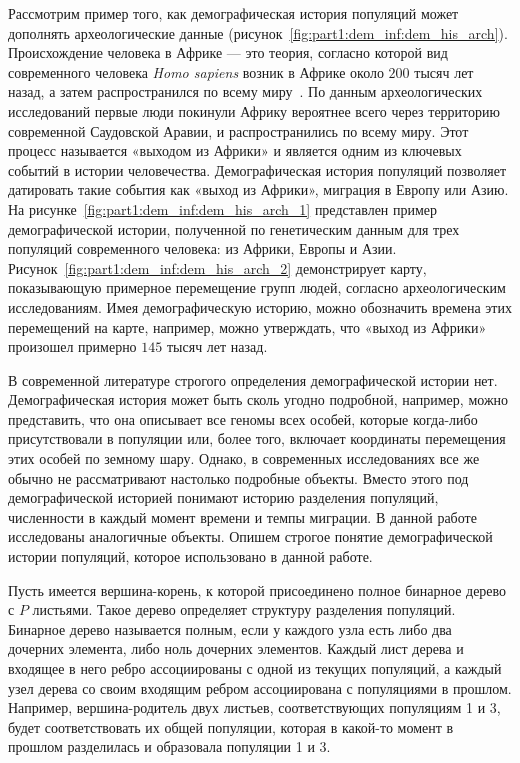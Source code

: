 Рассмотрим пример того, как демографическая история популяций может дополнять археологические данные (рисунок~\ref{fig:part1:dem_inf:dem_his_arch}).
Происхождение человека в Африке --- это теория, согласно которой вид современного человека \textit{Homo sapiens} возник в Африке около $200$ тысяч лет назад, а затем распространился по всему миру~\cite{nielsen2017tracing}.
По данным археологических исследований первые люди покинули Африку вероятнее всего через территорию современной Саудовской Аравии, и распространились по всему миру.
Этот процесс называется «выходом из Африки» и является одним из ключевых событий в истории человечества.
Демографическая история популяций позволяет датировать такие события как «выход из Африки», миграция в Европу или Азию.
На рисунке~\ref{fig:part1:dem_inf:dem_his_arch_1} представлен пример демографической истории, полученной по генетическим данным для трех популяций современного человека: из Африки, Европы и Азии.
Рисунок~\ref{fig:part1:dem_inf:dem_his_arch_2} демонстрирует карту, показывающую примерное перемещение групп людей, согласно археологическим исследованиям.
Имея демографическую историю, можно обозначить времена этих перемещений на карте, например, можно утверждать, что «выход из Африки» произошел примерно $145$ тысяч лет назад.


В современной литературе строгого определения демографической истории нет.
Демографическая история может быть сколь угодно подробной, например, можно представить, что она описывает все геномы всех особей, которые когда-либо присутствовали в популяции или, более того, включает координаты перемещения этих особей по земному шару.
Однако, в современных исследованиях все же обычно не рассматривают настолько подробные объекты.
Вместо этого под демографической историей понимают историю разделения популяций, численности в каждый момент времени и темпы миграции.
В данной работе исследованы аналогичные объекты.
Опишем строгое понятие демографической истории популяций, которое использовано в данной работе.

Пусть имеется вершина-корень, к которой присоединено полное бинарное дерево с $P$ листьями.
Такое дерево определяет структуру разделения популяций. 
Бинарное дерево называется полным, если у каждого узла есть либо два дочерних элемента, либо ноль дочерних элементов. Каждый лист дерева и входящее в него ребро ассоциированы с одной из текущих популяций, а каждый узел дерева со своим входящим ребром ассоциирована с популяциями в прошлом.
Например, вершина-родитель двух листьев, соответствующих популяциям 1 и 3, будет соответствовать их общей популяции, которая в какой-то момент в прошлом разделилась и образовала популяции 1 и 3.

